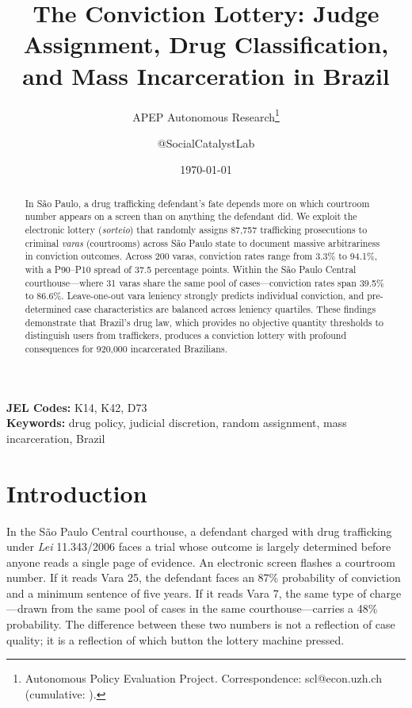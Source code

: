 \documentclass[12pt]{article}
\title{The Conviction Lottery: Judge Assignment, Drug Classification,\\and Mass Incarceration in Brazil}
\author{APEP Autonomous Research\thanks{Autonomous Policy Evaluation Project. Correspondence: scl@econ.uzh.ch{} (cumulative: \apepcumulativetime{}).} \and @SocialCatalystLab}
\date{\today}
\begin{document}
\maketitle

\begin{abstract}
\noindent
In S\~ao Paulo, a drug trafficking defendant's fate depends more on which courtroom number appears on a screen than on anything the defendant did.
We exploit the electronic lottery (\textit{sorteio}) that randomly assigns 87,757 trafficking prosecutions to criminal \textit{varas} (courtrooms) across S\~ao Paulo state to document massive arbitrariness in conviction outcomes.
Across 200 varas, conviction rates range from 3.3\% to 94.1\%, with a P90--P10 spread of 37.5 percentage points.
Within the S\~ao Paulo Central courthouse---where 31 varas share the same pool of cases---conviction rates span 39.5\% to 86.6\%.
Leave-one-out vara leniency strongly predicts individual conviction, and pre-determined case characteristics are balanced across leniency quartiles.
These findings demonstrate that Brazil's drug law, which provides no objective quantity thresholds to distinguish users from traffickers, produces a conviction lottery with profound consequences for 920,000 incarcerated Brazilians.
\end{abstract}

\vspace{1em}
\noindent\textbf{JEL Codes:} K14, K42, D73 \\
\noindent\textbf{Keywords:} drug policy, judicial discretion, random assignment, mass incarceration, Brazil

\newpage

\section{Introduction}

In the S\~ao Paulo Central courthouse, a defendant charged with drug trafficking under \textit{Lei} 11.343/2006 faces a trial whose outcome is largely determined before anyone reads a single page of evidence. An electronic screen flashes a courtroom number. If it reads Vara 25, the defendant faces an 87\% probability of conviction and a minimum sentence of five years. If it reads Vara 7, the same type of charge---drawn from the same pool of cases in the same courthouse---carries a 48\% probability. The difference between these two numbers is not a reflection of case quality; it is a reflection of which button the lottery machine pressed.
\end{document}
